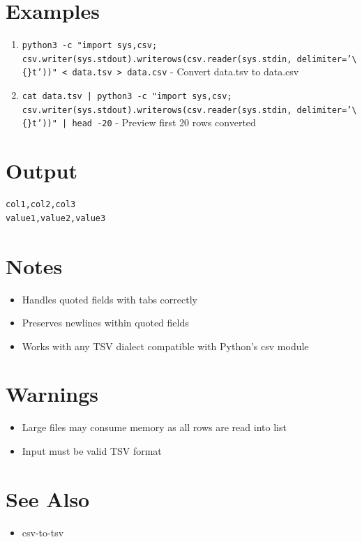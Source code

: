 \documentclass{article}
\begin{document}
\section*{Examples}
\begin{enumerate}
  \item \texttt{python3 -c "import sys,csv; csv.writer(sys.stdout).writerows(csv.reader(sys.stdin, delimiter='\textbackslash\{\}t'))" < data.tsv > data.csv} - Convert data.tsv to data.csv
  \item \texttt{cat data.tsv | python3 -c "import sys,csv; csv.writer(sys.stdout).writerows(csv.reader(sys.stdin, delimiter='\textbackslash\{\}t'))" | head -20} - Preview first 20 rows converted
\end{enumerate}

\section*{Output}
\begin{lstlisting}
col1,col2,col3
value1,value2,value3

\end{lstlisting}

\section*{Notes}
\begin{itemize}
  \item Handles quoted fields with tabs correctly
  \item Preserves newlines within quoted fields
  \item Works with any TSV dialect compatible with Python's csv module
\end{itemize}

\section*{Warnings}
\begin{itemize}
  \item Large files may consume memory as all rows are read into list
  \item Input must be valid TSV format
\end{itemize}

\section*{See Also}
\begin{itemize}
  \item csv-to-tsv
\end{itemize}
\end{document}
